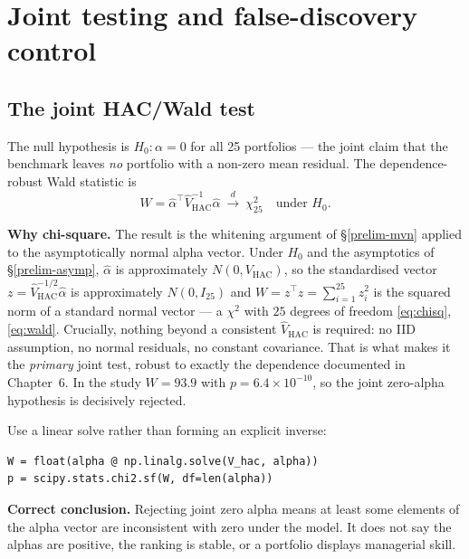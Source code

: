 \hypertarget{testing}{}
\hypertarget{joint-testing-and-false-discovery-control}{%
\chapter{Joint testing and false-discovery
control}\label{joint-testing-and-false-discovery-control}}

\hypertarget{the-joint-hacwald-test}{%
\section{The joint HAC/Wald test}\label{the-joint-hacwald-test}}

The null hypothesis is $H_0:\alpha=0$ for all 25 portfolios --- the joint
claim that the benchmark leaves \emph{no} portfolio with a non-zero mean
residual. The dependence-robust Wald statistic is
\begin{equation}\label{eq:ch7-wald}
W = \hat\alpha^{\top}\hat V_{\mathrm{HAC}}^{-1}\hat\alpha
\ \xrightarrow{d}\ \chi^2_{25}\quad\text{under }H_0 .
\end{equation}

\textbf{Why chi-square.} The result is the whitening argument of
\S\ref{prelim-mvn} applied to the asymptotically normal alpha vector. Under
$H_0$ and the asymptotics of \S\ref{prelim-asymp}, $\hat\alpha$ is
approximately $N(0,V_{\mathrm{HAC}})$, so the standardised vector
$z=\hat V_{\mathrm{HAC}}^{-1/2}\hat\alpha$ is approximately $N(0,I_{25})$ and
$W=z^{\top}z=\sum_{i=1}^{25}z_i^2$ is the squared norm of a standard normal
vector --- a $\chi^2$ with $25$ degrees of freedom \eqref{eq:chisq},
\eqref{eq:wald}. Crucially, nothing beyond a consistent
$\hat V_{\mathrm{HAC}}$ is required: no IID assumption, no normal residuals,
no constant covariance. That is what makes it the \emph{primary} joint
test, robust to exactly the dependence documented in Chapter~6. In the
study $W=93.9$ with $p=6.4\times10^{-10}$, so the joint zero-alpha
hypothesis is decisively rejected.

Use a linear solve rather than forming an explicit inverse:

\begin{verbatim}
W = float(alpha @ np.linalg.solve(V_hac, alpha))
p = scipy.stats.chi2.sf(W, df=len(alpha))
\end{verbatim}

\textbf{Correct conclusion.} Rejecting joint zero alpha means at least
some elements of the alpha vector are inconsistent with zero under the
model. It does not say the alphas are positive, the ranking is stable,
or a portfolio displays managerial skill.

